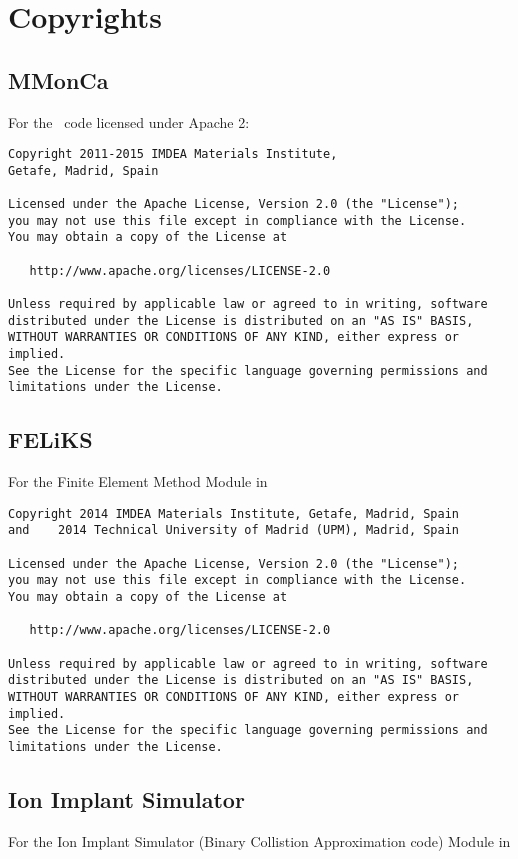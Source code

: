 \section{Copyrights}
\subsection{MMonCa}
For the \MMonCa\ code licensed under Apache 2:

\begin{verbatim}
Copyright 2011-2015 IMDEA Materials Institute, 
Getafe, Madrid, Spain
 
Licensed under the Apache License, Version 2.0 (the "License");
you may not use this file except in compliance with the License.
You may obtain a copy of the License at

   http://www.apache.org/licenses/LICENSE-2.0

Unless required by applicable law or agreed to in writing, software
distributed under the License is distributed on an "AS IS" BASIS,
WITHOUT WARRANTIES OR CONDITIONS OF ANY KIND, either express or implied.
See the License for the specific language governing permissions and
limitations under the License.
\end{verbatim}

\subsection{FELiKS}
For the Finite Element Method Module in \MMonCa\
\begin{verbatim}
Copyright 2014 IMDEA Materials Institute, Getafe, Madrid, Spain
and    2014 Technical University of Madrid (UPM), Madrid, Spain

Licensed under the Apache License, Version 2.0 (the "License");
you may not use this file except in compliance with the License.
You may obtain a copy of the License at

   http://www.apache.org/licenses/LICENSE-2.0

Unless required by applicable law or agreed to in writing, software
distributed under the License is distributed on an "AS IS" BASIS,
WITHOUT WARRANTIES OR CONDITIONS OF ANY KIND, either express or implied.
See the License for the specific language governing permissions and
limitations under the License.
\end{verbatim}

\subsection{Ion Implant Simulator}
For the Ion Implant Simulator (Binary Collistion Approximation code) Module in \MMonCa\

